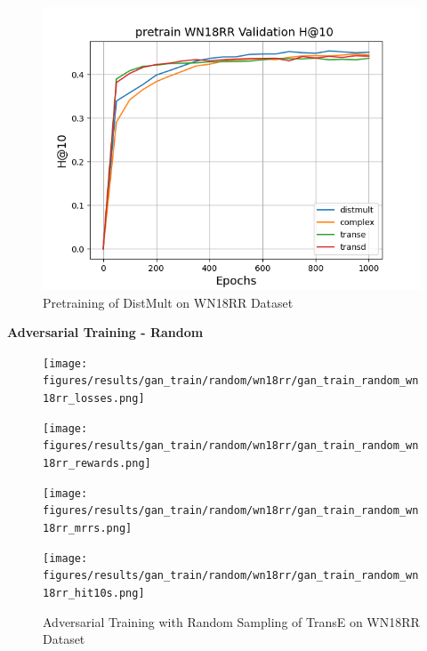 \begin{figure}
    \begin{minipage}{.3\textwidth}
      \centering
      \includegraphics[width=0.9\linewidth]{figures/results/pretrain/wn18rr/pretrain_wn18rr_hit10s.png}
    \end{minipage}%
    \caption{Pretraining of DistMult on WN18RR Dataset}
    \label{fig:test}
\end{figure}

\pagebreak


\textbf{Adversarial Training - Random}\\
\begin{figure}
    \centering
    \begin{minipage}{.5\textwidth}
      \centering
      \texttt{[image: figures/results/gan\_train/random/wn18rr/gan\_train\_random\_wn18rr\_losses.png]}
    \end{minipage}%
    \begin{minipage}{.5\textwidth}
      \centering
      \texttt{[image: figures/results/gan\_train/random/wn18rr/gan\_train\_random\_wn18rr\_rewards.png]}
    \end{minipage}
    \begin{minipage}{.5\textwidth}
      \centering
      \texttt{[image: figures/results/gan\_train/random/wn18rr/gan\_train\_random\_wn18rr\_mrrs.png]}
   \end{minipage}%
    \begin{minipage}{.5\textwidth}
      \centering
      \texttt{[image: figures/results/gan\_train/random/wn18rr/gan\_train\_random\_wn18rr\_hit10s.png]}
    \end{minipage}%
    \caption{Adversarial Training with Random Sampling of TransE on WN18RR Dataset}
    \label{fig:test}
\end{figure}

